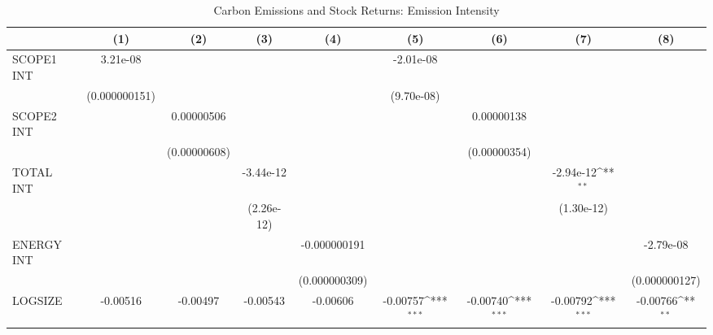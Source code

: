 \begin{table}[htbp]\centering
\def\sym#1{\ifmmode^{#1}\else\(^{#1}\)\fi}
\caption{Carbon Emissions and Stock Returns: Emission Intensity}
\begin{tabular}{l*{8}{c}}
\hline\hline
                    &\multicolumn{1}{c}{(1)}         &\multicolumn{1}{c}{(2)}         &\multicolumn{1}{c}{(3)}         &\multicolumn{1}{c}{(4)}         &\multicolumn{1}{c}{(5)}         &\multicolumn{1}{c}{(6)}         &\multicolumn{1}{c}{(7)}         &\multicolumn{1}{c}{(8)}         \\
\hline
SCOPE1 INT          &    3.21e-08         &                     &                     &                     &   -2.01e-08         &                     &                     &                     \\
                    &(0.000000151)         &                     &                     &                     &  (9.70e-08)         &                     &                     &                     \\
SCOPE2 INT          &                     &  0.00000506         &                     &                     &                     &  0.00000138         &                     &                     \\
                    &                     &(0.00000608)         &                     &                     &                     &(0.00000354)         &                     &                     \\
TOTAL INT           &                     &                     &   -3.44e-12         &                     &                     &                     &   -2.94e-12\sym{**} &                     \\
                    &                     &                     &  (2.26e-12)         &                     &                     &                     &  (1.30e-12)         &                     \\
ENERGY INT          &                     &                     &                     &-0.000000191         &                     &                     &                     &   -2.79e-08         \\
                    &                     &                     &                     &(0.000000309)         &                     &                     &                     &(0.000000127)         \\
LOGSIZE             &    -0.00516         &    -0.00497         &    -0.00543         &    -0.00606         &    -0.00757\sym{***}&    -0.00740\sym{***}&    -0.00792\sym{***}&    -0.00766\sym{**} \\

\end{tabular}
\end{table}
